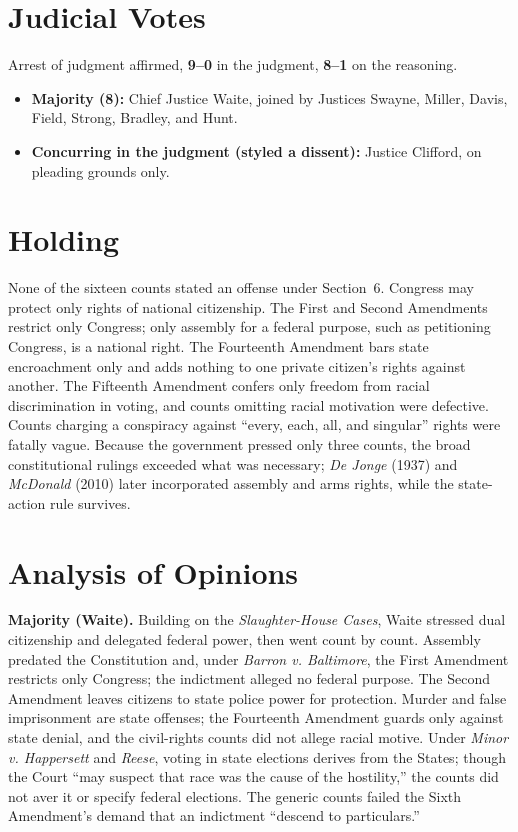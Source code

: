 \documentclass[12pt]{article}
\begin{document}
\section{Judicial Votes}

Arrest of judgment affirmed, \textbf{9--0} in the judgment, \textbf{8--1} on the reasoning.
\begin{itemize}
\item \textbf{Majority (8):} Chief Justice Waite, joined by Justices Swayne, Miller, Davis, Field, Strong, Bradley, and Hunt.
\item \textbf{Concurring in the judgment (styled a dissent):} Justice Clifford, on pleading grounds only.
\end{itemize}

\section{Holding}

None of the sixteen counts stated an offense under Section~6. Congress may protect only rights of national citizenship. The First and Second Amendments restrict only Congress; only assembly for a federal purpose, such as petitioning Congress, is a national right. The Fourteenth Amendment bars state encroachment only and adds nothing to one private citizen's rights against another. The Fifteenth Amendment confers only freedom from racial discrimination in voting, and counts omitting racial motivation were defective. Counts charging a conspiracy against ``every, each, all, and singular'' rights were fatally vague. Because the government pressed only three counts, the broad constitutional rulings exceeded what was necessary; \textit{De Jonge} (1937) and \textit{McDonald} (2010) later incorporated assembly and arms rights, while the state-action rule survives.

\section{Analysis of Opinions}

\textbf{Majority (Waite).} Building on the \textit{Slaughter-House Cases}, Waite stressed dual citizenship and delegated federal power, then went count by count. Assembly predated the Constitution and, under \textit{Barron v. Baltimore}, the First Amendment restricts only Congress; the indictment alleged no federal purpose. The Second Amendment leaves citizens to state police power for protection. Murder and false imprisonment are state offenses; the Fourteenth Amendment guards only against state denial, and the civil-rights counts did not allege racial motive. Under \textit{Minor v. Happersett} and \textit{Reese}, voting in state elections derives from the States; though the Court ``may suspect that race was the cause of the hostility,'' the counts did not aver it or specify federal elections. The generic counts failed the Sixth Amendment's demand that an indictment ``descend to particulars.''
\end{document}
